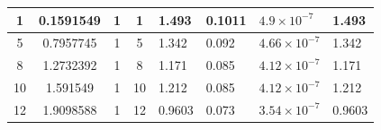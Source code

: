 \documentclass{article}
\begin{document}
\begin{table}[H]
\begin{tabular}{|c|c|c|c|l|l|l|l|}
1                                                             & 0.1591549                                                & 1                                                       & 1                                                             & 1.493                                                                        & 0.1011                                                                         & $ 4.9\times10^{-7} $                                                      & 1.493                                                                     \\ \hline
5                                                             & 0.7957745                                                & 1                                                       & 5                                                             & 1.342                                                                        & 0.092                                                                          & $ 4.66\times10^{-7}$                                                    & 1.342                                                                     \\ \hline
8                                                             & 1.2732392                                                & 1                                                       & 8                                                             & 1.171                                                                        & 0.085                                                                          & $ 4.12\times10^{-7}$                                                     & 1.171                                                                     \\ \hline
10                                                            & 1.591549                                                 & 1                                                       & 10                                                            & 1.212                                                                        & 0.085                                                                          & $ 4.12\times10^{-7}$                                                     & 1.212                                                                     \\ \hline
12                                                            & 1.9098588                                                & 1                                                       & 12                                                            & 0.9603                                                                       & 0.073                                                                          & $ 3.54\times10^{-7}$                                                     & 0.9603                                                                    \\ \hline

\end{tabular}
\end{table}
\end{document}
